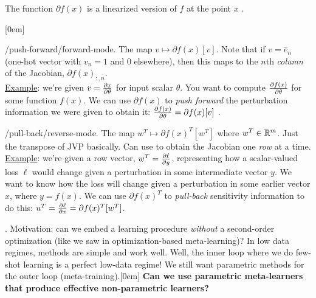 \documentclass[11pt]{article}
\begin{document}
\begin{myquote}
	The function $\partial f(x)$ is a linearized version of $f$ at the point $x$ .
\end{myquote}


 [0em] 
\begin{compactitem}
	\item {}/push-forward/forward-mode. The map $v \mapsto \partial f(x) [v]$. Note that if $v = \hat{e}_n$ (one-hot vector with $v_n = 1$ and 0 elsewhere), then this maps to the $n$th \textit{column} of the Jacobian, $\partial f(x)_{:, n}$. \\
	
	\underline{Example}: we're given $v = \frac{\partial x}{\partial \theta}$ for input scalar $\theta$. You want to compute $\frac{\partial f(x)}{\partial \theta}$ for some function $f(x)$. We can use $\partial f(x)$ to \textit{push forward} the perturbation information we were given to obtain it: $\frac{\partial f(x)}{\partial \theta} = \partial f(x) [v]$ . 
	
	\item {}/pull-back/reverse-mode. The map $w^T \mapsto \partial f(x)^T [w^T]$ where $w^T \in \mathbb{R}^m$. Just the transpose of JVP basically. Can use to obtain the Jacobian one \textit{row} at a time. \\
	
	\underline{Example}: we're given a row vector, $w^T = \frac{\partial \ell}{\partial y}$, representing how a scalar-valued loss $\ell$ would change given a perturbation in some intermediate vector $y$. We want to know how the loss will change given a perturbation in some earlier vector $x$, where $y = f(x)$. We can use $\partial f(x)^T$ to \textit{pull-back} sensitivity information to do this: $u^T = \frac{\partial \ell}{\partial x} = \partial f(x)^T [w^T]$.  
\end{compactitem}






.  Motivation: can we embed a learning procedure \textit{without} a second-order optimization (like we saw in optimization-based meta-learning)? In low data regimes,  methods are simple and work well. Well, the inner loop where we do few-shot learning is a perfect low-data regime! We still want parametric methods for the outer loop (meta-training).[0em] \textbf{Can we use parametric meta-learners that produce effective non-parametric learners?} \\
\end{document}
